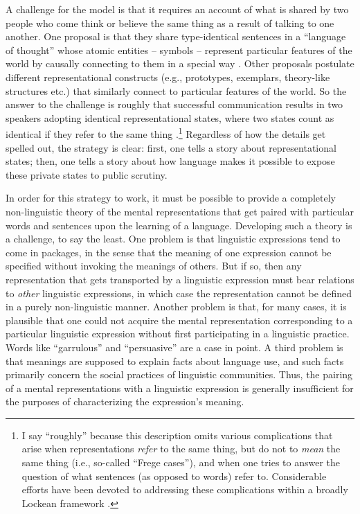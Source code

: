A challenge for the model is that it requires an account of what is shared by two people who come think or believe the same thing as a result of talking to one another. One proposal is that they share type-identical sentences in a ``language of thought'' whose atomic entities -- symbols -- represent particular features of the world by causally connecting to them in a special way \citep{Fodor:1998}. Other proposals postulate different representational constructs (e.g., prototypes, exemplars, theory-like structures etc.) that similarly connect to particular features of the world. So the answer to the challenge is roughly that successful communication results in two speakers adopting identical representational states, where two states count as identical if they refer to the same thing \citep{Fodor:1998}.\footnote{I say ``roughly'' because this description omits various complications that arise when representations \textit{refer} to the same thing, but do not to \textit{mean} the same thing (i.e., so-called ``Frege cases''), and when one tries to answer the question of what sentences (as opposed to words) refer to. Considerable efforts have been devoted to addressing these complications within a broadly Lockean framework \citep[see e.g.,][]{Speaks:2014}.} Regardless of how the details get spelled out, the strategy is clear: first, one tells a story about representational states; then, one tells a story about how language makes it possible to expose these private states to public scrutiny. 

In order for this strategy to work, it must be possible to provide a completely non-linguistic theory of the mental representations that get paired with particular words and sentences upon the learning of a language. Developing such a theory is a challenge, to say the least. One problem is that linguistic expressions tend to come in packages, in the sense that the meaning of one expression cannot be specified without invoking the meanings of others. But if so, then any representation that gets transported by a linguistic expression must bear relations to \textit{other} linguistic expressions, in which case the representation cannot be defined in a purely non-linguistic manner. Another problem is that, for many cases, it is plausible that one could not acquire the mental representation corresponding to a particular linguistic expression without first participating in a linguistic practice. Words like ``garrulous'' and ``persuasive'' are a case in point. A third problem is that meanings are supposed to explain facts about language use, and such facts primarily concern the social practices of linguistic communities. Thus, the pairing of a mental representations with a linguistic expression is generally insufficient for the purposes of characterizing the expression's meaning. 

